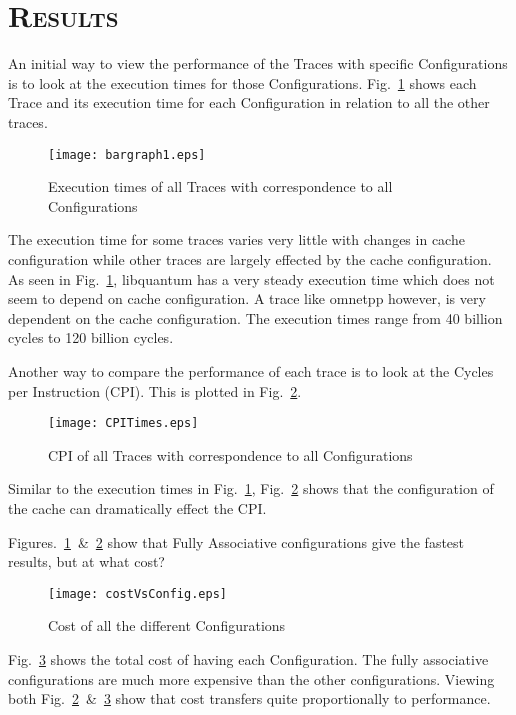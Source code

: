 \documentclass[FinalReport.tex]{subfiles}
\begin{document}
\section*{\textsc{\Large Results}}

An initial way to view the performance of the Traces with specific Configurations is to look at the execution times for those Configurations.  Fig.~\ref{fig:executiontimes} shows each Trace and its execution time for each Configuration in relation to all the other traces.
\begin{figure}[H]
\centering
\texttt{[image: bargraph1.eps]}
\caption{Execution times of all Traces with correspondence to all Configurations\label{fig:executiontimes}}
\end{figure}
The execution time for some traces varies very little with changes in cache configuration while other traces are largely effected by the cache configuration.  As seen in Fig.~\ref{fig:executiontimes}, {libquantum} has a very steady execution time which does not seem to depend on cache configuration.  A trace like {omnetpp} however, is very dependent on the cache configuration.  The execution times range from 40 billion cycles to 120 billion cycles. 

Another way to compare the performance of each trace is to look at the Cycles per Instruction (CPI).  This is plotted in Fig.~\ref{fig:CPI}.
\begin{figure}[H]
\centering
\texttt{[image: CPITimes.eps]}
\caption{CPI of all Traces with correspondence to all Configurations\label{fig:CPI}}
\end{figure}

Similar to the execution times in Fig.~\ref{fig:executiontimes}, Fig.~\ref{fig:CPI} shows that the configuration of the cache can dramatically effect the CPI. 

Figures.~\ref{fig:executiontimes}~\&~\ref{fig:CPI} show that Fully Associative configurations give the fastest results, but at what cost? 
\begin{figure}[H]
\centering
\texttt{[image: costVsConfig.eps]}
\caption{Cost of all the different Configurations\label{fig:costVsConfig}}
\end{figure}
Fig.~\ref{fig:costVsConfig} shows the total cost of having each Configuration.  The fully associative configurations are much more expensive than the other configurations.  Viewing both Fig.~\ref{fig:CPI}~\&~\ref{fig:costVsConfig} show that cost transfers quite proportionally to performance.  
\end{document}
